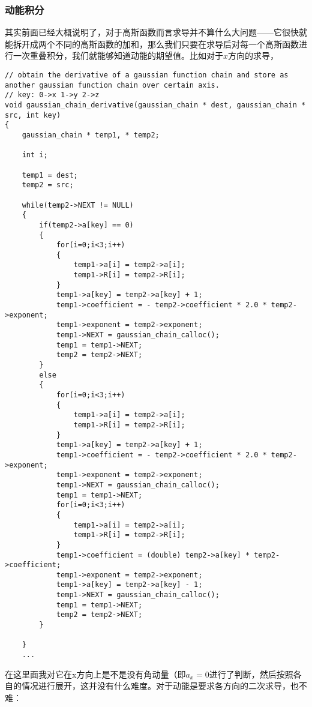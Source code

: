 \documentclass[12pt,a4paper,openany,twoside]{article}
\numberwithin{equation}{section}
\begin{document}
                \subsubsection{动能积分}
                其实前面已经大概说明了，对于高斯函数而言求导并不算什么大问题——它很快就能拆开成两个不同的高斯函数的加和，那么我们只要在求导后对每一个高斯函数进行一次重叠积分，我们就能够知道动能的期望值。比如对于$x$方向的求导，
                \begin{lstlisting}
// obtain the derivative of a gaussian function chain and store as another gaussian function chain over certain axis.
// key: 0->x 1->y 2->z
void gaussian_chain_derivative(gaussian_chain * dest, gaussian_chain * src, int key)
{
    gaussian_chain * temp1, * temp2;

    int i;

    temp1 = dest;
    temp2 = src;

    while(temp2->NEXT != NULL)
    {
        if(temp2->a[key] == 0)
        {
            for(i=0;i<3;i++)
            {
                temp1->a[i] = temp2->a[i];
                temp1->R[i] = temp2->R[i];
            }
            temp1->a[key] = temp2->a[key] + 1;
            temp1->coefficient = - temp2->coefficient * 2.0 * temp2->exponent;
            temp1->exponent = temp2->exponent;
            temp1->NEXT = gaussian_chain_calloc();
            temp1 = temp1->NEXT;
            temp2 = temp2->NEXT;
        }
        else
        {
            for(i=0;i<3;i++)
            {
                temp1->a[i] = temp2->a[i];
                temp1->R[i] = temp2->R[i];
            }
            temp1->a[key] = temp2->a[key] + 1;
            temp1->coefficient = - temp2->coefficient * 2.0 * temp2->exponent;
            temp1->exponent = temp2->exponent;
            temp1->NEXT = gaussian_chain_calloc();
            temp1 = temp1->NEXT;
            for(i=0;i<3;i++)
            {
                temp1->a[i] = temp2->a[i];
                temp1->R[i] = temp2->R[i];
            }
            temp1->coefficient = (double) temp2->a[key] * temp2->coefficient;
            temp1->exponent = temp2->exponent;
            temp1->a[key] = temp2->a[key] - 1;
            temp1->NEXT = gaussian_chain_calloc();
            temp1 = temp1->NEXT;
            temp2 = temp2->NEXT;
        }

    }
    ...
                \end{lstlisting}
                在这里面我对它在x方向上是不是没有角动量（即$a_x = 0$进行了判断，然后按照各自的情况进行展开，这并没有什么难度。对于动能是要求各方向的二次求导，也不难：
\end{document}
